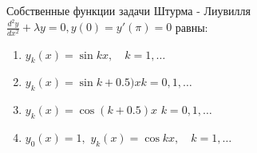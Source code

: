 Собственные функции задачи Штурма - Лиувилля \(\frac{d^2y}{dx^2}+\lambda y =0, y\left(0\right)=y'\left(\pi \right) =0\) равны:

\begin{enumerate}[label=\arabic*)]
    \item \(y_k\left(x\right)=\sin kx,\quad k=1,\dots\)
    \item \(y_k\left(x\right)=\sin k+0.5)x k=0,1,\dots\)
    \item \(y_k\left(x\right)=\cos (k+0.5)x\) \(k=0,1,\dots\)
    \item \(y_0\left(x\right)=1,\) \(y_k\left(x\right)=\cos kx,\quad k=1,\dots\)
\end{enumerate}

